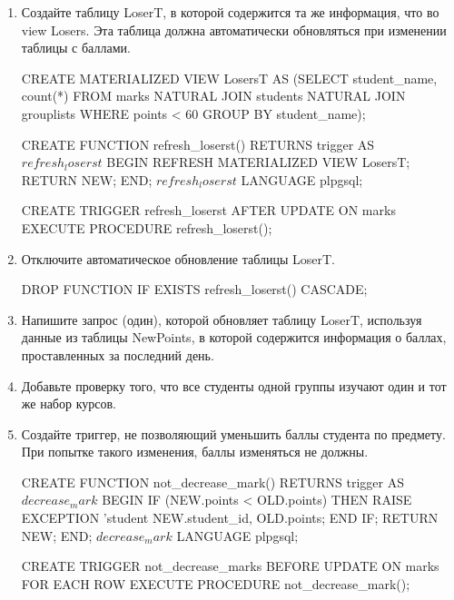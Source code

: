\documentclass[10pt, a4paper]{article}
\begin{document}
\begin{enumerate}
	\item {Создайте таблицу \textsf{LoserT}, в которой содержится та же информация, что во view \textsf{Losers}. Эта таблица должна автоматически обновляться при изменении таблицы с баллами.

	\begin{sql}
CREATE MATERIALIZED VIEW LosersT AS
	(SELECT student_name, count(*) FROM
	marks NATURAL JOIN students NATURAL JOIN grouplists
		WHERE points < 60 GROUP BY student_name);

CREATE FUNCTION refresh_loserst() RETURNS trigger AS $refresh_loserst$ 
BEGIN
	REFRESH MATERIALIZED VIEW LosersT;
	RETURN NEW;
END; 
$refresh_loserst$ LANGUAGE plpgsql;

CREATE TRIGGER refresh_loserst AFTER UPDATE ON marks
	EXECUTE PROCEDURE refresh_loserst();
	\end{sql}
	}

	\item {Отключите автоматическое обновление таблицы \textsf{LoserT}.

	\begin{sql}
DROP FUNCTION IF EXISTS refresh_loserst() CASCADE;
	\end{sql}

	}

	\item {Напишите запрос (один), которой обновляет таблицу \textsf{LoserT}, используя данные из таблицы \textsf{NewPoints}, в которой содержится информация о баллах, проставленных за последний день.

	}

	\item {Добавьте проверку того, что все студенты одной группы изучают один и тот же набор курсов.

	}

	\item {Создайте триггер, не позволяющий уменьшить баллы студента по предмету. При попытке такого изменения, баллы изменяться не должны.

	\begin{sql}
CREATE FUNCTION not_decrease_mark() RETURNS trigger AS $decrease_mark$ 
BEGIN 
	IF (NEW.points < OLD.points) THEN	
		RAISE EXCEPTION 'student %
		NEW.student_id, OLD.points;
	END IF;
	RETURN NEW;
END; 
$decrease_mark$ LANGUAGE plpgsql;

CREATE TRIGGER not_decrease_marks BEFORE UPDATE ON marks
	FOR EACH ROW EXECUTE PROCEDURE not_decrease_mark();
	\end{sql}
	}

\end{enumerate}
\end{document}
